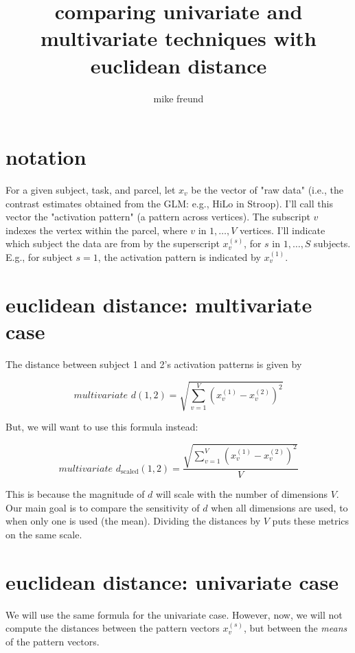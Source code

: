 \documentclass[]{article}
\title{comparing univariate and multivariate techniques with euclidean distance}
\author{mike freund}
\begin{document}
\maketitle


\section*{notation}

For a given subject, task, and parcel, let $x_v$ be the vector of "raw data" (i.e., the contrast estimates obtained from the GLM: e.g., Hi\textunderscore Lo in Stroop).
I'll call this vector the "activation pattern" (a pattern across vertices).
The subscript $v$ indexes the vertex within the parcel, where $v \text{ in } 1, \dots, V$ vertices.
I'll indicate which subject the data are from by the superscript $x_v^{(s)}$, for $s \text{ in } 1, \dots, S$ subjects.
E.g., for subject $s = 1$, the activation pattern is indicated by $x_v^{(1)}$.

\section*{euclidean distance: multivariate case}

The distance between subject 1 and 2's activation patterns is given by

\begin{equation}
	\textit{multivariate d}(1, 2) = \sqrt{\sum_{v = 1}^{V}(x_v^{(1)} - x_v^{(2)})^2}
\end{equation}


But, we will want to use this formula instead:

\begin{equation}
	\textit{multivariate d}_{\text{scaled}}(1, 2) = \frac{\sqrt{\sum_{v = 1}^{V}(x_v^{(1)} - x_v^{(2)})^2}}{V}
\end{equation}

This is because the magnitude of $d$ will scale with the number of dimensions $V$.
Our main goal is to compare the sensitivity of $d$ when all dimensions are used, to when only one is used (the mean).
Dividing the distances by $V$ puts these metrics on the same scale.

\section*{euclidean distance: univariate case}

We will use the same formula for the univariate case.
However, now, we will not compute the distances between the pattern vectors $x_v^{(s)}$, but between the \textit{means} of the pattern vectors.
\end{document}
